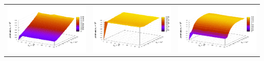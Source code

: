 \documentclass[12pt,a4paper]{article}
\theoremstyle{definition}
\begin{document}
\begin{table}[h]
\begin{tabular}{c c c}
	\includegraphics[scale=0.4]{figs/resonance/p1.txt_coeff1.dat.pdf} & \includegraphics[scale=0.4]{figs/resonance/p2.txt_coeff1.dat.pdf} & \includegraphics[scale=0.4]{figs/resonance/p3.txt_coeff1.dat.pdf} \\

\end{tabular}
\end{table}
\end{document}
